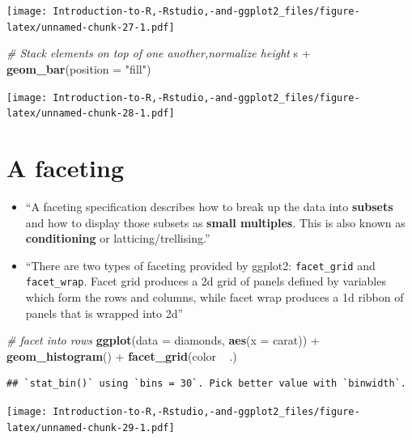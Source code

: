 \documentclass[]{book}
\newenvironment{Shaded}{\begin{snugshade}}{\end{snugshade}}
\newcommand{\KeywordTok}[1]{\textcolor[rgb]{0.13,0.29,0.53}{\textbf{{#1}}}}
\newcommand{\DataTypeTok}[1]{\textcolor[rgb]{0.13,0.29,0.53}{{#1}}}
\newcommand{\StringTok}[1]{\textcolor[rgb]{0.31,0.60,0.02}{{#1}}}
\newcommand{\CommentTok}[1]{\textcolor[rgb]{0.56,0.35,0.01}{\textit{{#1}}}}
\newcommand{\NormalTok}[1]{{#1}}
\begin{document}
\texttt{[image: Introduction-to-R,-Rstudio,-and-ggplot2\_files/figure-latex/unnamed-chunk-27-1.pdf]}

\begin{Shaded}
\begin{Highlighting}[]
\CommentTok{# Stack elements on top of one another,normalize height}
\NormalTok{s +}\StringTok{ }\KeywordTok{geom_bar}\NormalTok{(}\DataTypeTok{position =} \StringTok{"fill"}\NormalTok{)}
\end{Highlighting}
\end{Shaded}

\texttt{[image: Introduction-to-R,-Rstudio,-and-ggplot2\_files/figure-latex/unnamed-chunk-28-1.pdf]}

\section{A faceting}\label{a-faceting}

\begin{itemize}
\item
  ``A faceting specification describes how to break up the data into
  \textbf{subsets} and how to display those subsets as \textbf{small
  multiples}. This is also known as \textbf{conditioning} or
  latticing/trellising.'' \citep{ggplot2}
\item
  ``There are two types of faceting provided by ggplot2:
  \texttt{facet\_grid} and \texttt{facet\_wrap}. Facet grid produces a
  2d grid of panels defined by variables which form the rows and
  columns, while facet wrap produces a 1d ribbon of panels that is
  wrapped into 2d'' \citep{ggplot2}
\end{itemize}

\begin{Shaded}
\begin{Highlighting}[]
\CommentTok{# facet into rows}
\KeywordTok{ggplot}\NormalTok{(}\DataTypeTok{data =} \NormalTok{diamonds, }\KeywordTok{aes}\NormalTok{(}\DataTypeTok{x =} \NormalTok{carat)) +}\StringTok{ }\KeywordTok{geom_histogram}\NormalTok{() +}\StringTok{ }\KeywordTok{facet_grid}\NormalTok{(color ~}\StringTok{ }\NormalTok{.)}
\end{Highlighting}
\end{Shaded}

\begin{verbatim}
## `stat_bin()` using `bins = 30`. Pick better value with `binwidth`.
\end{verbatim}

\texttt{[image: Introduction-to-R,-Rstudio,-and-ggplot2\_files/figure-latex/unnamed-chunk-29-1.pdf]}
\end{document}
